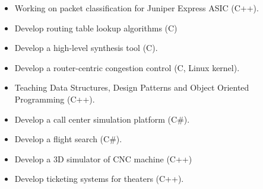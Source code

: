 \begin{itemize}
	\item Working on packet classification for Juniper Express ASIC (C++).
\end{itemize}

\divider

\begin{itemize}
	\item Develop routing table lookup algorithms (C)
	\item Develop a high-level synthesis tool (C).
	\item Develop a router-centric congestion control (C, Linux kernel).
	\item Teaching Data Structures, Design Patterns and Object Oriented Programming (C++).
\end{itemize}

\divider

\begin{itemize}
	\item Develop a call center simulation platform (C\#).
\end{itemize}

\divider

\begin{itemize}
	\item Develop a flight search (C\#).
\end{itemize}

\divider

\begin{itemize}
\item Develop a 3D simulator of CNC machine (C++)
\end{itemize}

\divider

\begin{itemize}
	\item Develop ticketing systems for theaters (C++).
\end{itemize}

